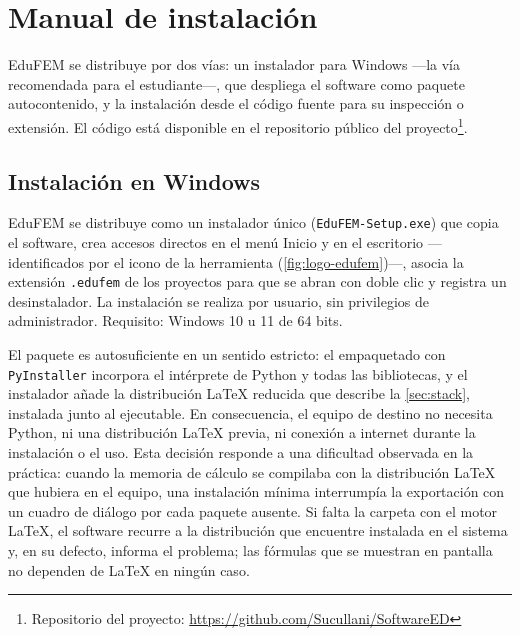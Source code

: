
\chapter{Manual de instalación}
\label{anexo:instalacion}

EduFEM se distribuye por dos vías: un instalador para Windows —la vía recomendada para el estudiante—, que despliega el software como paquete autocontenido, y la instalación desde el código fuente para su inspección o extensión. El código está disponible en el repositorio público del proyecto\footnote{Repositorio del proyecto: \url{https://github.com/Sucullani/SoftwareED}}.

\section{Instalación en Windows}

EduFEM se distribuye como un instalador único (\texttt{EduFEM-Setup.exe}) que copia el software, crea accesos directos en el menú Inicio y en el escritorio —identificados por el icono de la herramienta (\autoref{fig:logo-edufem})—, asocia la extensión \texttt{.edufem} de los proyectos para que se abran con doble clic y registra un desinstalador. La instalación se realiza por usuario, sin privilegios de administrador. Requisito: Windows 10 u 11 de 64 bits.

El paquete es autosuficiente en un sentido estricto: el empaquetado con \texttt{PyInstaller} incorpora el intérprete de Python y todas las bibliotecas, y el instalador añade la distribución \LaTeX{} reducida que describe la \autoref{sec:stack}, instalada junto al ejecutable. En consecuencia, el equipo de destino no necesita Python, ni una distribución \LaTeX{} previa, ni conexión a internet durante la instalación o el uso. Esta decisión responde a una dificultad observada en la práctica: cuando la memoria de cálculo se compilaba con la distribución \LaTeX{} que hubiera en el equipo, una instalación mínima interrumpía la exportación con un cuadro de diálogo por cada paquete ausente. Si falta la carpeta con el motor \LaTeX{}, el software recurre a la distribución que encuentre instalada en el sistema y, en su defecto, informa el problema; las fórmulas que se muestran en pantalla no dependen de \LaTeX{} en ningún caso.

